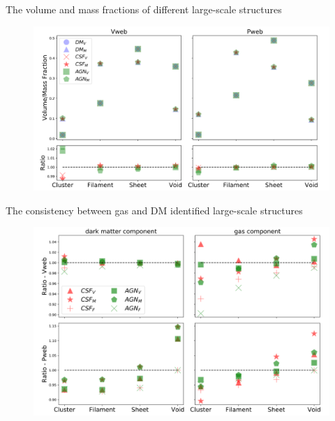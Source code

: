 \documentclass[aspectratio=169]{beamer}
\begin{document}
\begin{frame}{The volume and mass fractions of different large-scale structures}
\vspace{-0.3cm}
  \begin{figure}
    \includegraphics[height=0.85\textheight]{Fractions-BE}
  \end{figure}
\end{frame}

\begin{frame}{The consistency between gas and DM identified large-scale structures}
\vspace{-0.3cm}
  \begin{figure}
    \includegraphics[height=0.85\textheight]{Fractions-gasweb}
  \end{figure}
\end{frame}

\begin{frame}[plain,c]
\end{frame}
\end{document}

